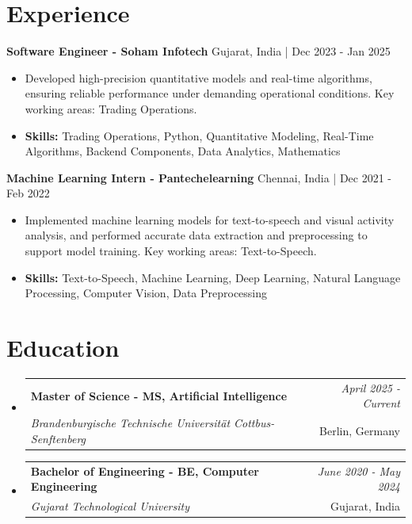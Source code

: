 \documentclass[a4paper,11pt]{article}
\makeatletter
\newcommand{\resumeSubheading}[4]{
\vspace{0.5mm}\item
    \begin{tabular*}{\linewidth}[t]{l@{\extracolsep{\fill}}r}
        \textbf{#1} & \textit{\footnotesize{#4}} \\
        \textit{\footnotesize{#3}} &  \footnotesize{#2}\\
    \end{tabular*}
    \vspace{-2.4mm}
}
\makeatother
\begin{document}
\section{\textbf{Experience}}


\vspace{1mm}
  \textbf{Software Engineer - Soham Infotech} \hfill Gujarat, India | Dec 2023 - Jan 2025
\vspace{-1.5mm} %
\begin{itemize}
  \item Developed high-precision quantitative models and real-time algorithms, ensuring reliable performance under demanding operational conditions. Key working areas: Trading Operations.

\vspace{-2mm}
  \item \textbf{Skills:} Trading Operations, Python, Quantitative Modeling, Real-Time Algorithms, Backend Components, Data Analytics, Mathematics
\end{itemize}

\vspace{1mm}
  \textbf{Machine Learning Intern - Pantechelearning} \hfill Chennai, India | Dec 2021 - Feb 2022
\vspace{-1.5mm} %
\begin{itemize}
  \item Implemented machine learning models for text-to-speech and visual activity analysis, and performed accurate data extraction and preprocessing to support model training. Key working areas: Text-to-Speech.
\vspace{-2mm}
  \item \textbf{Skills:} Text-to-Speech, Machine Learning, Deep Learning, Natural Language Processing, Computer Vision, Data Preprocessing
\end{itemize}\section{\textbf{Education}}
\vspace{-0.4mm}

\begin{itemize}[leftmargin=0.15in, label={}]
\resumeSubheading
{Master of Science - MS, Artificial Intelligence }{Berlin, Germany}
{Brandenburgische Technische Universität Cottbus-Senftenberg  }{April 2025 - Current}

\vspace{1.0mm} %
\resumeSubheading
{Bachelor of Engineering - BE, Computer Engineering  }{Gujarat, India}
{Gujarat Technological University }{June 2020 - May 2024}

\end{itemize}
\end{document}
